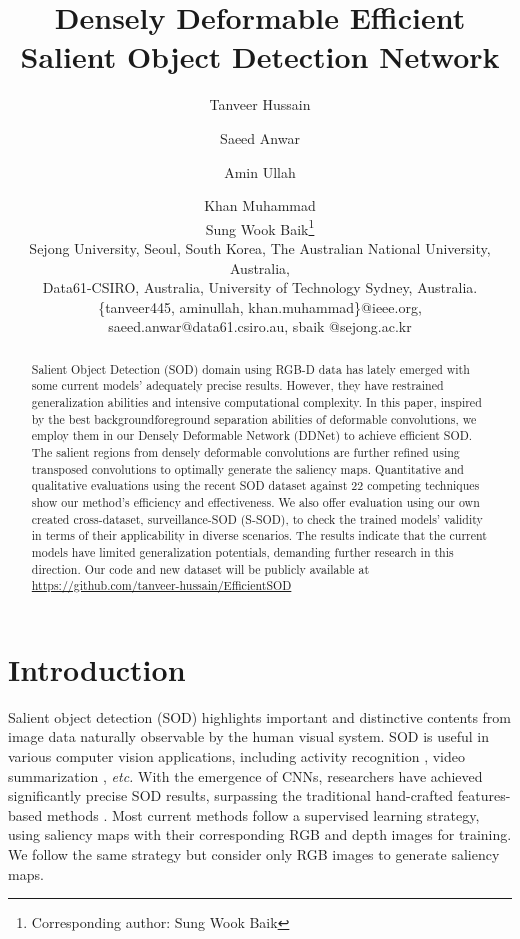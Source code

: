 \documentclass{article}
\title{Densely Deformable Efficient Salient Object Detection Network}
\newcommand{\latinphrase}[1]{\textit{#1}}
\newcommand{\etc}{\latinphrase{etc.}\xspace}
\begin{document}
\author{
Tanveer Hussain\and
Saeed Anwar\and
Amin Ullah\and
Khan Muhammad\And \\
Sung Wook Baik\footnote{Corresponding author: Sung Wook Baik}\\
\affiliations
Sejong University, Seoul, South Korea, 
The Australian National University, Australia,\\ 
Data61-CSIRO, Australia, 
University of Technology Sydney, Australia.
\emails
\{tanveer445, aminullah, khan.muhammad\}@ieee.org,
saeed.anwar@data61.csiro.au,
sbaik @sejong.ac.kr}

\maketitle
\begin{abstract}

Salient Object Detection (SOD) domain using RGB-D data has lately emerged with some current models' adequately precise results. However, they have restrained generalization abilities and intensive computational complexity. In this paper, inspired by the best backgroundforeground separation abilities of deformable convolutions, we employ them in our Densely Deformable Network (DDNet) to achieve efficient SOD. The salient regions from densely deformable convolutions are further refined using transposed convolutions to optimally generate the saliency maps. Quantitative and qualitative evaluations using the recent SOD dataset against 22 competing techniques show our method's efficiency and effectiveness. We also offer evaluation using our own created cross-dataset, surveillance-SOD (S-SOD), to check the trained models' validity in terms of their applicability in diverse scenarios. The results indicate that the current models have limited generalization potentials, demanding further research in this direction. Our code and new dataset will be publicly available at \url{https://github.com/tanveer-hussain/EfficientSOD}

\end{abstract}

\section{Introduction}
Salient object detection (SOD) highlights important and distinctive contents from image data naturally observable by the human visual system. SOD is useful in various computer vision applications, including activity recognition \cite{ullah2020conflux}, video summarization \cite{hussain2021comprehensive}, \etc With the emergence of CNNs, researchers have achieved significantly precise SOD results, surpassing the traditional hand-crafted features-based methods \cite{cheng2014depth}. Most current methods follow a supervised learning strategy, using saliency maps with their corresponding RGB and depth images for training. We follow the same strategy but consider only RGB images to generate saliency maps.
\end{document}
